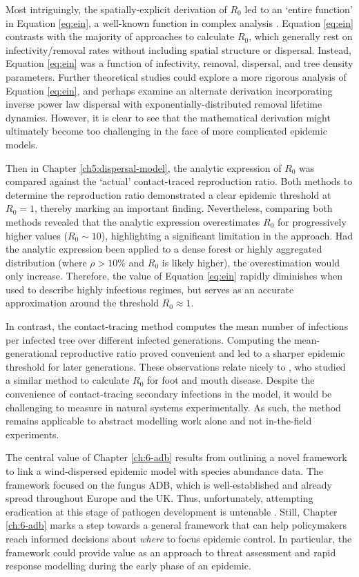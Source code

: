 Most intriguingly, the spatially-explicit derivation of $R_0$ led to an `entire function' in Equation \ref{eq:ein}, a well-known function in complex analysis  \cite{abramowitz1948handbook}. 
Equation \ref{eq:ein} contrasts with the majority of approaches to calculate $R_0$, which generally rest on infectivity/removal rates without including spatial structure or dispersal. Instead, Equation \ref{eq:ein} was a function of infectivity, removal, dispersal, and tree density parameters. Further theoretical studies could explore a more rigorous analysis of Equation \ref{eq:ein}, and perhaps examine an alternate derivation incorporating inverse power law dispersal with exponentially-distributed removal lifetime dynamics.
However, it is clear to see that the mathematical derivation might ultimately become too challenging in the face of more complicated epidemic models. 

Then in Chapter \ref{ch5:dispersal-model}, the analytic expression of $R_0$ was compared against the `actual' contact-traced reproduction ratio. Both methods to determine the reproduction ratio demonstrated a clear epidemic threshold at $R_0=1$, thereby marking an important finding. Nevertheless, comparing both methods revealed that the analytic expression overestimates $R_0$ for progressively higher values ($R_0 \sim 10$), highlighting a significant limitation in the approach. 
Had the analytic expression been applied to a dense forest or highly aggregated distribution (where $\rho >10\%$ and $R_0$ is likely higher), the overestimation would only increase.
Therefore, the value of Equation \ref{eq:ein} rapidly diminishes when used to describe highly infectious regimes, but serves as an accurate approximation around the threshold $R_0 \approx 1$.

In contrast, the contact-tracing method computes the mean number of infections per infected tree over different infected generations.
Computing the mean-generational reproductive ratio proved convenient and led to a sharper epidemic threshold for later generations. These observations relate nicely to \cite{R0-perc-ref}, who studied a similar method to calculate $R_0$ for foot and mouth disease.
Despite the convenience of contact-tracing secondary infections in the model, it would be challenging to measure in natural systems experimentally.
As such, the method remains applicable to abstract modelling work alone and not in-the-field experiments.

The central value of Chapter \ref{ch:6-adb} results from outlining a novel framework to link a wind-dispersed epidemic model with species abundance data. 
The framework focused on the fungus ADB, which is well-established and already spread throughout Europe and the UK.
Thus, unfortunately, attempting eradication at this stage of pathogen development is untenable \cite{ash-dieback-costs}. 
Still, Chapter \ref{ch:6-adb} marks a step towards a general framework that can help policymakers reach informed decisions about \textit{where} to focus epidemic control.
In particular, the framework could provide value as an approach to threat assessment and rapid response modelling during the early phase of an epidemic.

